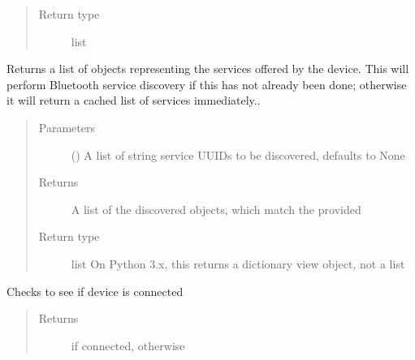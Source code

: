 \documentclass[letterpaper,10pt,english]{sphinxmanual}
\begin{document}
\begin{fulllineitems}
\begin{fulllineitems}
\begin{quote}
\begin{description}
\item[{Return type}] \leavevmode
list

\end{description}\end{quote}

\end{fulllineitems}


\begin{fulllineitems}
\label{\detokenize{PandaBot:PandaBot.PandaBotDevice.getServices}}
Returns a list of  objects representing the services offered by the device. This will perform Bluetooth service discovery if this has not already been done; otherwise it will return a cached list of services immediately..
\begin{quote}\begin{description}
\item[{Parameters}] \leavevmode
{} (\sphinxstyleliteralemphasis{\sphinxupquote{, }}) \textendash{} A list of string service UUIDs to be discovered, defaults to None

\item[{Returns}] \leavevmode
A list of the discovered  objects, which match the provided 

\item[{Return type}] \leavevmode
list On Python 3.x, this returns a dictionary view object, not a list

\end{description}\end{quote}

\end{fulllineitems}


\begin{fulllineitems}
\label{\detokenize{PandaBot:PandaBot.PandaBotDevice.isConnected}}
Checks to see if device is connected
\begin{quote}\begin{description}
\item[{Returns}] \leavevmode
{} if connected,  otherwise


\end{description}
\end{quote}
\end{fulllineitems}
\end{fulllineitems}
\end{document}
